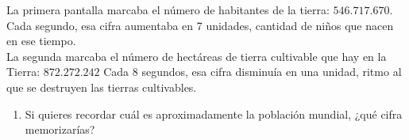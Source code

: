 \documentclass[twoside]{article}
\begin{document}
\begin{enumerate}
La primera pantalla marcaba el número de habitantes de la tierra: $5 4 6. 7 1 7 . 6 7 0$. Cada segundo, esa cifra aumentaba en 7 unidades, cantidad de niños que nacen en ese tiempo.\\
La segunda marcaba el número de hectáreas de tierra cultivable que hay en la Tierra: $8 7 2 . 2 7 2 . 2 4 2$
Cada 8 segundos, esa cifra disminuía en una unidad, ritmo al que se destruyen las tierras cultivables.
\begin{enumerate}
\item Si quieres recordar cuál es aproximadamente la población mundial, ¿qué cifra memorizarías?
\end{enumerate}
\end{enumerate}
\end{document}
